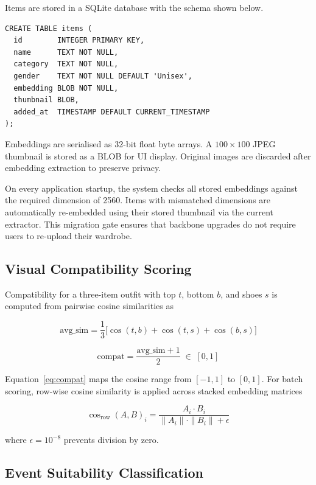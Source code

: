 \documentclass[conference]{IEEEtran}
\begin{document}
Items are stored in a SQLite database with the schema shown below.

\begin{verbatim}
CREATE TABLE items (
  id        INTEGER PRIMARY KEY,
  name      TEXT NOT NULL,
  category  TEXT NOT NULL,
  gender    TEXT NOT NULL DEFAULT 'Unisex',
  embedding BLOB NOT NULL,
  thumbnail BLOB,
  added_at  TIMESTAMP DEFAULT CURRENT_TIMESTAMP
);
\end{verbatim}

Embeddings are serialised as 32-bit float byte arrays. A $100\times100$ JPEG thumbnail is stored as a BLOB for UI display. Original images are discarded after embedding extraction to preserve privacy.

On every application startup, the system checks all stored embeddings against the required dimension of 2560. Items with mismatched dimensions are automatically re-embedded using their stored thumbnail via the current extractor. This migration gate ensures that backbone upgrades do not require users to re-upload their wardrobe.

\subsection{Visual Compatibility Scoring}

Compatibility for a three-item outfit with top $t$, bottom $b$, and shoes $s$ is computed from pairwise cosine similarities as

\begin{equation}
\text{avg\_sim} = \frac{1}{3}\bigl[\cos(t,b) + \cos(t,s) + \cos(b,s)\bigr]
\label{eq:avg_sim}
\end{equation}

\begin{equation}
\text{compat} = \frac{\text{avg\_sim} + 1}{2} \;\in\; [0,1]
\label{eq:compat}
\end{equation}

Equation~\eqref{eq:compat} maps the cosine range from $[-1,1]$ to $[0,1]$. For batch scoring, row-wise cosine similarity is applied across stacked embedding matrices

\begin{equation}
\cos_{\text{row}}(A, B)_i = \frac{A_i \cdot B_i}{\|A_i\| \cdot \|B_i\| + \epsilon}
\label{eq:rowcos}
\end{equation}

where $\epsilon = 10^{-8}$ prevents division by zero.

\subsection{Event Suitability Classification}
\end{document}
